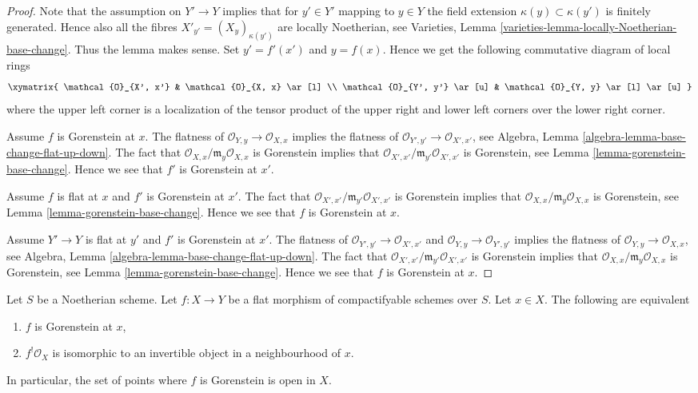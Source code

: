 \begin{proof}
Note that the assumption on $Y' \to Y$ implies that for $y' \in Y'$
mapping to $y \in Y$ the field extension $\kappa(y) \subset \kappa(y')$
is finitely generated. Hence also all the fibres
$X'_{y'} = (X_y)_{\kappa(y')}$ are locally Noetherian, see
Varieties, Lemma \ref{varieties-lemma-locally-Noetherian-base-change}.
Thus the lemma makes sense. Set $y' = f'(x')$ and $y = f(x)$.
Hence we get the following commutative diagram of local rings
$$
\xymatrix{
\mathcal{O}_{X', x'} & \mathcal{O}_{X, x} \ar[l] \\
\mathcal{O}_{Y', y'} \ar[u] & \mathcal{O}_{Y, y} \ar[l] \ar[u]
}
$$
where the upper left corner is a localization of the tensor product
of the upper right and lower left corners over the lower right corner.

\medskip\noindent
Assume $f$ is Gorenstein at $x$.
The flatness of $\mathcal{O}_{Y, y} \to \mathcal{O}_{X, x}$
implies the flatness of $\mathcal{O}_{Y', y'} \to \mathcal{O}_{X', x'}$, see
Algebra, Lemma \ref{algebra-lemma-base-change-flat-up-down}.
The fact that $\mathcal{O}_{X, x}/\mathfrak m_y\mathcal{O}_{X, x}$
is Gorenstein implies that
$\mathcal{O}_{X', x'}/\mathfrak m_{y'}\mathcal{O}_{X', x'}$
is Gorenstein, see
Lemma \ref{lemma-gorenstein-base-change}. Hence we see that $f'$
is Gorenstein at $x'$.

\medskip\noindent
Assume $f$ is flat at $x$ and $f'$ is Gorenstein at $x'$.
The fact that $\mathcal{O}_{X', x'}/\mathfrak m_{y'}\mathcal{O}_{X', x'}$
is Gorenstein implies that
$\mathcal{O}_{X, x}/\mathfrak m_y\mathcal{O}_{X, x}$
is Gorenstein, see
Lemma \ref{lemma-gorenstein-base-change}. Hence we see that $f$
is Gorenstein at $x$.

\medskip\noindent
Assume $Y' \to Y$ is flat at $y'$ and $f'$ is Gorenstein at
$x'$. The flatness of $\mathcal{O}_{Y', y'} \to \mathcal{O}_{X', x'}$
and $\mathcal{O}_{Y, y} \to \mathcal{O}_{Y', y'}$ implies the flatness
of $\mathcal{O}_{Y, y} \to \mathcal{O}_{X, x}$, see
Algebra, Lemma \ref{algebra-lemma-base-change-flat-up-down}.
The fact that $\mathcal{O}_{X', x'}/\mathfrak m_{y'}\mathcal{O}_{X', x'}$
is Gorenstein implies that
$\mathcal{O}_{X, x}/\mathfrak m_y\mathcal{O}_{X, x}$
is Gorenstein, see
Lemma \ref{lemma-gorenstein-base-change}. Hence we see that $f$
is Gorenstein at $x$.
\end{proof}

\begin{lemma}
\label{lemma-affine-flat-Noetherian-gorenstein}
Let $S$ be a Noetherian scheme. Let $f : X \to Y$ be a flat
morphism of compactifyable schemes over $S$. Let $x \in X$.
The following are equivalent
\begin{enumerate}
\item $f$ is Gorenstein at $x$,
\item $f^!\mathcal{O}_X$ is isomorphic to an invertible object
in a neighbourhood of $x$.
\end{enumerate}
In particular, the set of points where $f$ is Gorenstein is
open in $X$.
\end{lemma}

